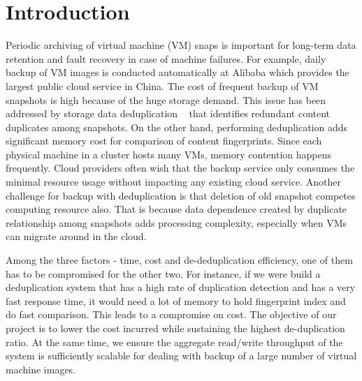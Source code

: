 \section{Introduction}



Periodic  archiving of virtual machine (VM) snaps is important 
for long-term data  retention and fault recovery in case of machine failures.  
For example, daily backup of VM images  is conducted automatically 
at Alibaba which provides the largest public cloud service in China.
The cost of frequent backup of VM snapshots is  high because of the huge storage demand.
This issue has been addressed by   storage data deduplication ~\cite{venti02,bottleneck08} that
identifies redundant content duplicates among snapshots.  On the other hand, performing
deduplication adds significant  memory cost for comparison of content fingerprints. 
Since each physical machine in a cluster  hosts many VMs, memory contention happens frequently. 
Cloud providers often wish that the backup service only consumes  the minimal resource usage without 
impacting any existing cloud service.  Another challenge for backup with deduplication is that deletion 
of old snapshot competes computing resource also. That is because data dependence created 
by duplicate relationship among snapshots  adds processing complexity, especially when  
VMs can migrate around in the cloud. 

Among the three factors - time, cost and de-deduplication efficiency, one of them has to be compromised for the other two. For instance, if we were build a deduplication system that has a high rate of duplication detection and has a very fast response time, 
it would need a lot of memory to hold fingerprint index and do fast comparison.  This leads to a compromise on cost. 
The objective of our project is to lower the cost incurred while sustaining the highest de-duplication ratio. 
At the same time, we ensure the aggregate read/write throughput of the system 
is sufficiently scalable  for dealing with backup of a large number of virtual machine images. 

